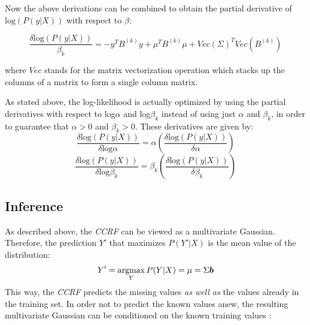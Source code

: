 Now the above derivations can be combined to obtain the partial derivative of $\text{log}(P(y|X))$ with respect to $\beta$:

\begin{equation}
\frac{\delta\text{log}(P(y|X))}{\beta_k} = -y^T B^{(k)} y + \mu^T B^{(k)} \mu + Vec(\Sigma)^T Vec(B^{(k)})
\end{equation}

where $Vec$ stands for the matrix vectorization operation which stacks up the columns of a matrix to form a single column matrix.

As stated above, the log-likelihood is actually optimized by using the partial derivatives with respect to log$\alpha$ and log$\beta_k$ instead of using just $\alpha$ and $\beta_k$, in order to guarantee that $\alpha>0$ and $\beta_k>0$. These derivatives are given by:
\begin{equation}
\frac{\delta\text{log}(P(y|X))}{\delta\text{log} \alpha} = \alpha (\frac{\delta\text{log}(P(y|X))}{\delta \alpha})
\end{equation}
\begin{equation}
\frac{\delta\text{log}(P(y|X))}{\delta\text{log} \beta_k} = \beta_k (\frac{\delta\text{log}(P(y|X))}{\delta \beta_k})
\end{equation}




\subsection{Inference}

As described above, the \textit{CCRF} can be viewed as a multivariate Gaussian. Therefore, the prediction $Y'$ that maximizes $P(Y'|X)$ is the mean value of the distribution:
\begin{equation}
Y' = \operatorname*{argmax}_{Y} P(Y|X) = \mu = \Sigma\boldsymbol{b}
\end{equation}
This way, the \textit{CCRF} predicts the missing values \textit{as well as} the values already in the training set. In order not to predict the known values anew, the resulting multivariate Gaussian can be conditioned on the known training values \cite{johnson2002continuous}:

